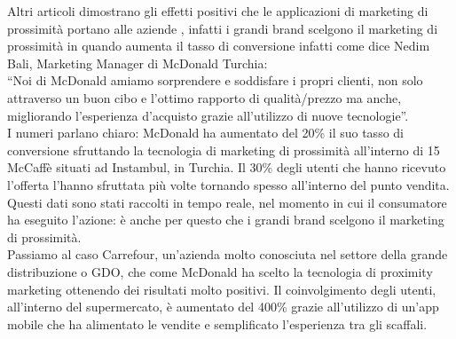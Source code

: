 Altri articoli dimostrano gli effetti positivi che le applicazioni di marketing di prossimità portano alle aziende , infatti i grandi brand scelgono il marketing di prossimità in quando aumenta il tasso di conversione infatti come dice Nedim Bali, Marketing Manager di McDonald Turchia:\\
“Noi di McDonald amiamo sorprendere e soddisfare i propri clienti, non solo attraverso un buon cibo e l’ottimo rapporto di qualità/prezzo ma anche, migliorando l’esperienza d’acquisto grazie all’utilizzo di nuove tecnologie”.\\
I numeri parlano chiaro:
McDonald ha aumentato del 20\% il suo tasso di conversione sfruttando la tecnologia di marketing di prossimità all’interno di 15 McCaffè situati ad Instambul, in Turchia. Il 30\% degli utenti che hanno ricevuto l’offerta l’hanno sfruttata più volte tornando spesso all’interno del punto vendita. Questi dati sono stati raccolti in tempo reale, nel momento in cui il consumatore ha eseguito l’azione: è anche per questo che i grandi brand scelgono il marketing di prossimità.\\
Passiamo al caso Carrefour, un’azienda molto conosciuta nel settore della grande distribuzione o GDO, che come McDonald ha scelto la tecnologia di proximity marketing ottenendo dei risultati molto positivi. Il coinvolgimento degli utenti, all’interno del supermercato, è aumentato del 400\% grazie all’utilizzo di un’app mobile che ha alimentato le vendite e semplificato l’esperienza tra gli scaffali.\\[0.2cm]

